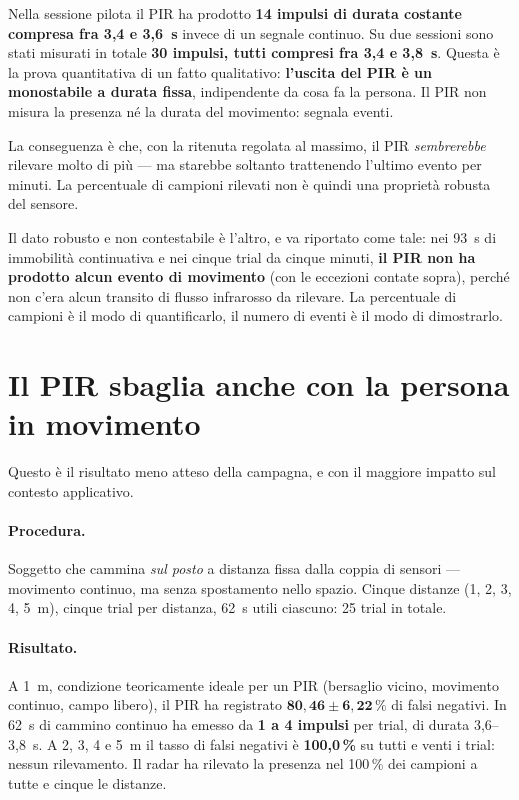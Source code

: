 Nella sessione pilota il PIR ha prodotto \textbf{14 impulsi di durata costante
compresa fra 3,4 e 3,6~s} invece di un segnale continuo. Su due sessioni sono stati
misurati in totale \textbf{30 impulsi, tutti compresi fra 3,4 e 3,8~s}. Questa è la
prova quantitativa di un fatto qualitativo: \textbf{l'uscita del PIR è un
monostabile a durata fissa}, indipendente da cosa fa la persona. Il PIR non misura
la presenza né la durata del movimento: segnala eventi.

La conseguenza è che, con la ritenuta regolata al massimo, il PIR
\emph{sembrerebbe} rilevare molto di più --- ma starebbe soltanto trattenendo
l'ultimo evento per minuti. La percentuale di campioni rilevati non è quindi una
proprietà robusta del sensore.

Il dato robusto e non contestabile è l'altro, e va riportato come tale: nei 93~s di
immobilità continuativa e nei cinque trial da cinque minuti, \textbf{il PIR non ha
prodotto alcun evento di movimento} (con le eccezioni contate sopra), perché non
c'era alcun transito di flusso infrarosso da rilevare. La percentuale di campioni è
il modo di quantificarlo, il numero di eventi è il modo di dimostrarlo.

\section{Il PIR sbaglia anche con la persona in movimento}
\label{sec:pir-movimento}

Questo è il risultato meno atteso della campagna, e con il maggiore impatto sul
contesto applicativo.

\paragraph{Procedura.} Soggetto che cammina \emph{sul posto} a distanza fissa dalla
coppia di sensori --- movimento continuo, ma senza spostamento nello spazio. Cinque
distanze (1, 2, 3, 4, 5~m), cinque trial per distanza, 62~s utili ciascuno: 25
trial in totale.

\paragraph{Risultato.} A 1~m, condizione teoricamente ideale per un PIR (bersaglio
vicino, movimento continuo, campo libero), il PIR ha registrato
$\mathbf{80{,}46 \pm 6{,}22\,\%}$ di falsi negativi. In 62~s di cammino continuo ha
emesso da \textbf{1 a 4 impulsi} per trial, di durata 3,6--3,8~s. A 2, 3, 4 e 5~m il
tasso di falsi negativi è \textbf{100,0\,\%} su tutti e venti i trial: nessun
rilevamento. Il radar ha rilevato la presenza nel 100\,\% dei campioni a tutte e
cinque le distanze.


